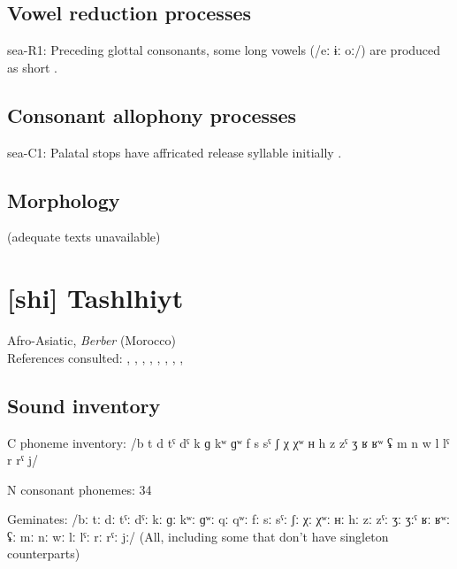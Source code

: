 {\subsection*{Vowel reduction processes}
\begin{appendixdesc}

\item[sea-R1:] Preceding glottal consonants, some long vowels (/eː ɨː oː/) are produced as short \citep[10--11]{Philips2007}.
\end{appendixdesc}
\subsection*{Consonant allophony processes}
\begin{appendixdesc}

\item[sea-C1:] Palatal stops have affricated release syllable initially \citep[5]{Philips2007}.
\end{appendixdesc}
\subsection*{Morphology}

(adequate texts unavailable)

\section*{[shi] Tashlhiyt}   %
Afro-Asiatic, \textit{Berber} (Morocco)\medskip\\
References consulted: \citet{Coleman2001}, \citet{DellElmedlaoui2002}, \citet{GordonNafi2012}, \citet{PuechLouali1999}, \citet{Ridouane2002}, \citet{Ridouane2007}, \citet{Ridouane2008}, \citet{Ridouane2014}, \citet{RoettgerEtAl2015}

\subsection*{Sound inventory}
\begin{appendixdesc}

\item[C phoneme inventory:] /b t d tˤ dˤ k ɡ kʷ ɡʷ f s sˤ ʃ χ χʷ ʜ h z zˤ ʒ ʁ ʁʷ ʢ m n w l lˤ r rˤ j/

\item[N consonant phonemes:] 34

\item[Geminates:] /bː tː dː tˤː dˤː kː ɡː kʷː ɡʷː qː qʷː fː sː sˤː ʃː χː χʷː ʜː hː zː zˤː ʒː ʒːˤ ʁː ʁʷː ʢː mː nː wː lː lˤː rː rˤː jː/ (All, including some that don’t have singleton counterparts)


\end{appendixdesc}}
